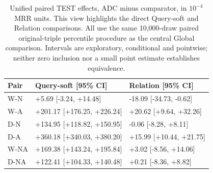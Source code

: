 \begin{table}[htbp]
\centering\footnotesize\setlength{\tabcolsep}{3pt}
\caption{Unified paired TEST effects, ADC minus comparator, in $10^{-4}$ MRR units. This view highlights the direct Query-soft and Relation comparisons. All use the same 10,000-draw paired original-triple percentile procedure as the central Global comparison. Intervals are exploratory, conditional and pointwise; neither zero inclusion nor a small point estimate establishes equivalence.}
\label{tab:query-nearest}
\begin{tabular}{lll}
\toprule
Pair & Query-soft [95\% CI] & Relation [95\% CI]\\
\midrule
W-N & +5.69 [-3.24, +14.48] & -18.09 [-34.73, -0.62]\\
W-A & +201.17 [+176.25, +226.24] & +20.62 [+9.64, +32.26]\\
D-N & +134.95 [+118.82, +150.95] & -0.06 [-8.28, +8.11]\\
D-A & +360.18 [+340.03, +380.20] & +15.99 [+10.44, +21.75]\\
W-NA & +169.38 [+143.24, +195.84] & +3.02 [-8.56, +14.06]\\
D-NA & +122.41 [+104.33, +140.48] & +0.21 [-8.36, +8.82]\\
\bottomrule
\end{tabular}
\end{table}
